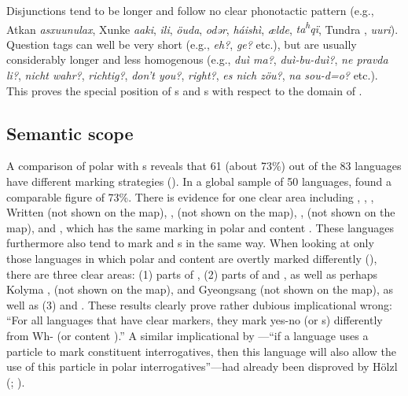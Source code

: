 Disjunctions tend to be longer and follow no clear phonotactic pattern (e.g., Atkan  \textit{asxuunulax}, Xunke  \textit{aaki},  \textit{ili},  \textit{öuda},  \textit{odər},  \textit{háishì},  \textit{ælde},  \textit{ta\textsuperscript{h}}\textit{qï}, Tundra  , \textit{uuri}). Question tags can well be very short (e.g.,  \textit{eh?},  \textit{ge?} etc.), but are usually considerably longer and less homogenous (e.g.,  \textit{duì ma?}, \textit{duì-bu-duì?},  \textit{ne pravda li?},  \textit{nicht wahr?}, \textit{richtig?},  \textit{don’t you?}, \textit{right?},  \textit{es nich zöu?},  \textit{na sou-d=o?} etc.). This proves the special position of s and s with respect to the domain of .

\subsection{Semantic scope}\label{sec:6.1.2}

A comparison of polar  with s reveals that 61 (about 73\%) out of the 83 languages have different marking strategies (). In a global sample of 50 languages, \cite{Hölzl2015c} found a comparable figure of 73\%. There is evidence for one clear area including , , , Written  (not shown on the map), ,  (not shown on the map), ,  (not shown on the map), and , which has the same marking in polar and content . These languages furthermore also tend to mark  and s in the same way. When looking at only those languages in which polar and content  are overtly marked differently (), there are three clear areas: (1) parts of , (2) parts of  and , as well as perhaps Kolyma ,  (not shown on the map), and Gyeongsang  (not shown on the map), as well as (3)  and . These results clearly prove  rather dubious implicational  wrong: “For all languages that have clear  markers, they mark yes-no  (or s) differently from Wh- (or content ).” A similar implicational  by \citet[1019]{Siemund2001}---“if a language uses a particle to mark constituent interrogatives, then this language will also allow the use of this particle in polar interrogatives”---had already been disproved by Hölzl (\citeyear{Hölzl2015c}; \citeyear[23]{Hölzl2016a}).


